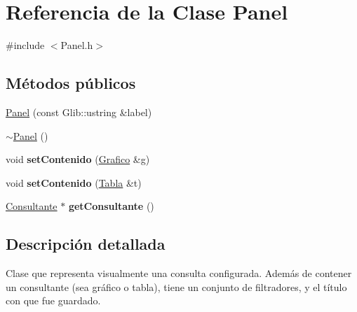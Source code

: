 \hypertarget{classPanel}{\section{\-Referencia de la \-Clase \-Panel}
\label{classPanel}
}


{\ttfamily \#include $<$\-Panel.\-h$>$}

\subsection*{\-Métodos públicos}
\begin{DoxyCompactItemize}
\item 
\hyperlink{classPanel_a472972c00119ab21bea8ab60327c54fd}{\-Panel} (const \-Glib\-::ustring \&label)
\item 
\hyperlink{classPanel_a93893b8e3923462b52e06e0003d11448}{$\sim$\-Panel} ()
\item 
\hypertarget{classPanel_a22125b7d4dc9e8c4fe59f432bf8bae2e}{void {\bfseries set\-Contenido} (\hyperlink{classGrafico}{\-Grafico} \&g)}\label{classPanel_a22125b7d4dc9e8c4fe59f432bf8bae2e}

\item 
\hypertarget{classPanel_a01bf0212b192c969fc78ff1594b2ea85}{void {\bfseries set\-Contenido} (\hyperlink{classTabla}{\-Tabla} \&t)}\label{classPanel_a01bf0212b192c969fc78ff1594b2ea85}

\item 
\hypertarget{classPanel_a0d401a477ecdaecc68bb603b2a805955}{\hyperlink{classConsultante}{\-Consultante} $\ast$ {\bfseries get\-Consultante} ()}\label{classPanel_a0d401a477ecdaecc68bb603b2a805955}

\end{DoxyCompactItemize}


\subsection{\-Descripción detallada}
\-Clase que representa visualmente una consulta configurada. \-Además de contener un consultante (sea gráfico o tabla), tiene un conjunto de filtradores, y el título con que fue guardado. 

